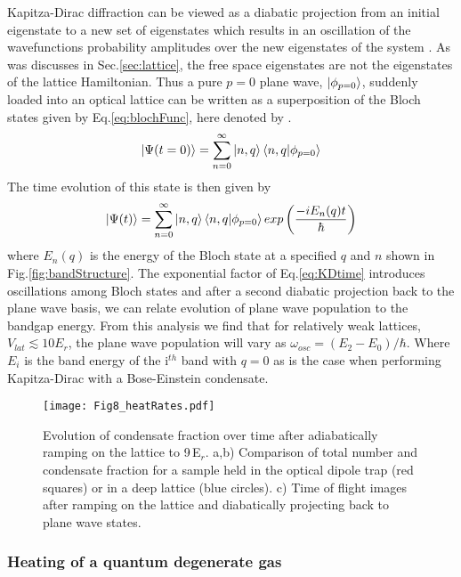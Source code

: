 	
Kapitza-Dirac diffraction can be viewed as a diabatic projection from an initial eigenstate to a new set of eigenstates which results in an oscillation of the wavefunctions probability amplitudes over the new eigenstates of the system \cite{Denschlag2002}. As was discusses in Sec.\;\ref{sec:lattice}, the free space eigenstates are not the eigenstates of the lattice Hamiltonian. Thus a pure $p=0$ plane wave, $\left| {\phi_{p=0}} \right>$, suddenly loaded into an optical lattice can be written as a superposition of the Bloch states given by Eq.\;\ref{eq:blochFunc}, here denoted by .
	\begin{equation} \label{eq:p0inBloch}
		\left| {\Psi(t=0)} \right> = \sum_{n=0}^{\infty} \left| {n,q} \right> \left< {n,q} | {\phi_{p=0}} \right>
	\end{equation}
The time evolution of this state is then given by
	\begin{equation} \label{eq:KDtime}
		\left| {\Psi(t)} \right> = \sum_{n=0}^{\infty} \left| {n,q} \right> \left< {n,q} | {\phi_{p=0}} \right> exp \left( \frac{-i E_n(q) t}{\hbar} \right)
	\end{equation}
where $E_n(q)$ is the energy of the Bloch state at a specified $q$ and $n$ shown in Fig.\;\ref{fig:bandStructure}. The exponential factor of Eq.\;\ref{eq:KDtime} introduces oscillations among Bloch states and after a second diabatic projection back to the plane wave basis, we can relate evolution of plane wave population to the bandgap energy. From this analysis we find that for relatively weak lattices, $V_{lat} \lesssim 10 E_r$, the plane wave population will vary as $\omega_{osc} = (E_2 - E_0) / \hbar$. Where $E_i$ is the band energy of the i$^{th}$ band with $q=0$ as is the case when performing Kapitza-Dirac with a Bose-Einstein condensate.


\begin{figure} \label{fig:heatingRates}
\centerline{
	\texttt{[image: Fig8\_heatRates.pdf]}}
	\caption{Evolution of condensate fraction over time after adiabatically ramping on the lattice to 9\,E$_r$. a,b) Comparison of total number and condensate fraction for a sample held in the optical dipole trap (red squares) or in a deep lattice (blue circles). c) Time of flight images after ramping on the lattice and diabatically projecting back to plane wave states. }
\end{figure} 
	


\subsubsection{Heating of a quantum degenerate gas}
\label{sssec:sideband_cooling}

